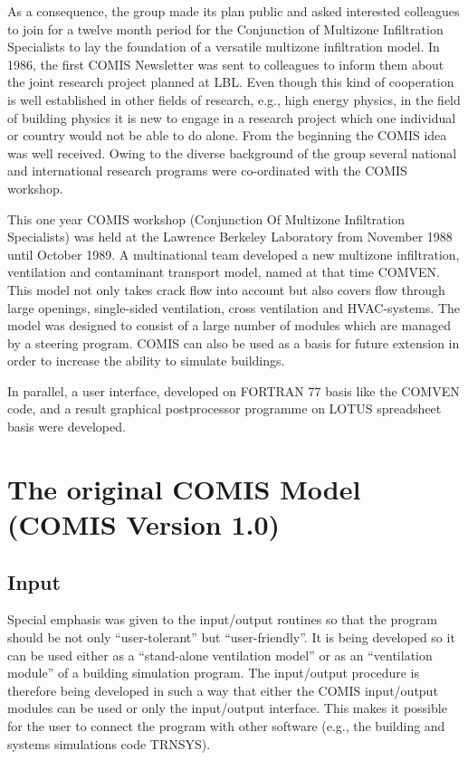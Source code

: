 \documentclass[10pt]{book}
\begin{document}
As a consequence, the group made its plan public and asked interested colleagues to join for a twelve month period for the Conjunction of Multizone Infiltration Specialists to lay the foundation of a versatile multizone infiltration model. In 1986, the first COMIS Newsletter was sent to colleagues to inform them about the joint research project planned at LBL. Even though this kind of cooperation is well established in other fields of research, e.g., high energy physics, in the field of building physics it is new to engage in a research project which one individual or country would not be able to do alone. From the beginning the COMIS idea was well received. Owing to the diverse background of the group several national and international research programs were co-ordinated with the COMIS workshop.

This one year COMIS workshop (Conjunction Of Multizone Infiltration Specialists) was held at the Lawrence Berkeley Laboratory from November 1988 until October 1989. A multinational team developed a new multizone infiltration, ventilation and contaminant transport model, named at that time COMVEN. This model not only takes crack flow into account but also covers flow through large openings, single-sided ventilation, cross ventilation and HVAC-systems. The model was designed to consist of a large number of modules which are managed by a steering program. COMIS can also be used as a basis for future extension in order to increase the ability to simulate buildings.

In parallel, a user interface, developed on FORTRAN 77 basis like the COMVEN code, and a result graphical postprocessor programme on LOTUS spreadsheet basis were developed.

\section{The original COMIS Model (COMIS Version 1.0)}

\subsection{Input}
Special emphasis was given to the input/output routines so that the program should be not only ``user-tolerant'' but ``user-friendly''. It is being developed so it can be used either as a ``stand-alone ventilation model'' or as an ``ventilation module'' of a building simulation program. The input/output procedure is therefore being developed in such a way that either the COMIS in­put/output modules can be used or only the input/output interface. This makes it possible for the user to connect the program with other software (e.g., the building and systems simulations code TRNSYS).
\end{document}
